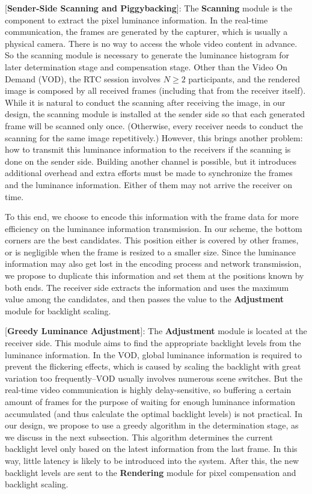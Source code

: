 [{\bf Sender-Side Scanning and Piggybacking}]:
The {\bf Scanning} module is the component to extract the pixel
luminance information. In the real-time communication, the frames are
generated by the capturer, which is usually a physical camera. There
is no way to access the whole video content in advance. So the
scanning module is necessary to generate the luminance histogram for
later determination stage and compensation stage. Other than the Video
On Demand (VOD), the RTC session involves $N \ge 2$ participants, and
the rendered image is composed by all received frames (including that
from the receiver itself). While it is natural to conduct the scanning
after receiving the image, in our design,  the scanning module is
installed at the sender side so that each generated frame will be
scanned only once. (Otherwise, every receiver needs to conduct the
scanning for the same image repetitively.)  However, this brings
another problem: how to transmit this luminance information to the
receivers if the scanning is done on the sender side. Building another
channel is possible, but it introduces additional overhead and extra
efforts must be made to synchronize the frames and the luminance
information. Either of them may not arrive the receiver on time.

To this end, we choose to encode this information with the frame data
for more efficiency on the luminance information transmission.  In our
scheme, the bottom corners are the best candidates. This position
either is covered by other frames, or is negligible when the frame is
resized to a smaller size.  Since the luminance information may also get
lost in the encoding process and network transmission, we propose to
duplicate this information and set them at the positions known by both
ends. The receiver side extracts the information and uses the maximum value
among the candidates, and then passes the value to the {\bf
  Adjustment} module for backlight scaling.

[{\bf Greedy Luminance Adjustment}]: The {\bf Adjustment} module is located at the receiver side. This
module aims to find the appropriate backlight levels from the
luminance information. In the VOD, global luminance information is
required to prevent the flickering effects, which is caused by scaling
the backlight with great variation too frequently--VOD usually
involves numerous scene switches. But 
 the real-time video communication is highly delay-sensitive, so buffering a certain
amount of frames for the purpose of waiting for enough luminance
information accumulated (and thus calculate the optimal backlight levels) is not
practical. In our design, we propose to use a greedy algorithm in the
determination stage, as we discuss in the next subsection. This
algorithm determines the current backlight level
only based on the latest information from the last frame. In this way,
little latency is likely to be introduced into the system. After this,
the new backlight levels are sent to the {\bf Rendering} module for
pixel compensation and backlight scaling.

